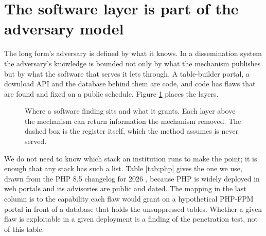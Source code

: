 \documentclass[11pt,a4paper]{article}
\begin{document}
\section{The software layer is part of the adversary model}\label{sec:software}
The long form's adversary is defined by what it knows. In a dissemination system the adversary's knowledge is bounded not only by what the mechanism publishes but by what the software that serves it lets through. A table-builder portal, a download API and the database behind them are code, and code has flaws that are found and fixed on a public schedule. Figure \ref{fig:layers} places the layers.

\begin{figure}[htbp]
\centering
{}
\caption{Where a software finding sits and what it grants. Each layer above the mechanism can return information the mechanism removed. The dashed box is the register itself, which the method assumes is never served.}
\label{fig:layers}
\end{figure}

We do not need to know which stack an institution runs to make the point; it is enough that any stack has such a list. Table \ref{tab:php} gives the one we use, drawn from the PHP 8.5 changelog for 2026 \citep{phpchangelog}, because PHP is widely deployed in web portals and its advisories are public and dated. The mapping in the last column is to the capability each flaw would grant on a hypothetical PHP-FPM portal in front of a database that holds the unsuppressed tables. Whether a given flaw is exploitable in a given deployment is a finding of the penetration test, not of this table.
\end{document}

